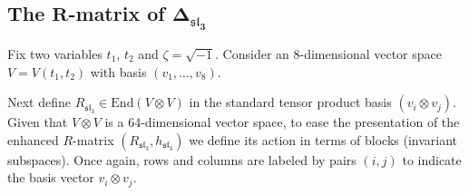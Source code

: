 \documentclass[pdftex]{sigma}
\numberwithin{equation}{section}
\theoremstyle{definition}
\begin{document}
\subsection[The R-matrix of Delta\_\{sl\_3\}]{The $\boldsymbol{R}$-matrix of $\boldsymbol{\Delta_{\mathfrak{sl}_3}}$}
\label{sec:app4}

Fix two variables $t_1$, $t_2$ and $\zeta=\sqrt{-1}$. Consider an 8-dimensional
vector space $V=V(t_1,t_2)$ with basis $(v_1,\dots,v_8)$.

Next define $R_{\mathfrak{sl}_3}\in\mathrm{End}{(V\otimes V)}$ in the standard tensor product
basis $(v_i\otimes v_j)$. Given that $V\otimes V$ is a 64-dimensional vector space,
to ease the presentation of the enhanced $R$-matrix $(R_{\mathfrak{sl}_3},h_{\mathfrak{sl}_3})$
we define its action in terms of blocks
(invariant subspaces). Once again, rows and columns are labeled by pairs $(i,j)$
to indicate the basis vector $v_i\otimes v_j$.
\end{document}
